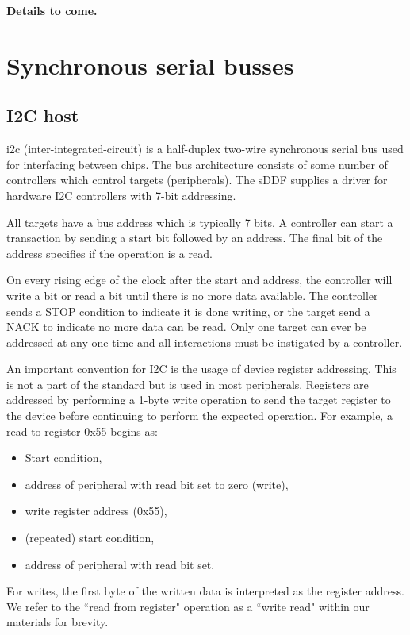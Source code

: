 \documentclass[a4paper,12pt]{report}
\newcommand{\ToCome}[1]{\textbf{#1 to come.}}
\begin{document}
\ToCome{Details}


\section{Synchronous serial busses}\label{s:cl-bus}

\subsection{I2C host}\label{s:cl-i2c}

\gls{i2c} (inter-integrated-circuit) is a half-duplex two-wire
synchronous serial bus used for interfacing between chips. The
bus architecture consists of some number of controllers
which control targets (peripherals). The sDDF supplies a
driver for hardware I2C controllers with 7-bit addressing.

All targets have a bus address which is typically 7 bits.
A controller can start a transaction by sending a start bit
followed by an address. The final bit of the address specifies
if the operation is a read.

On every rising edge of the clock after the start and address,
the controller will write a bit or read a bit until there is
no more data available. The controller sends a STOP condition
to indicate it is done writing, or the target send a NACK to
indicate no more data can be read. Only one target can ever
be addressed at any one time and all interactions must be
instigated by a controller.

An important convention for I2C is the usage of device register
addressing. This is not a part of the standard but is used in
most peripherals. Registers are addressed by performing a 1-byte
write operation to send the target register to the device before
continuing to perform the expected operation. For example, a read
to register 0x55 begins as:
\begin{itemize}
  \item Start condition,
  \item address of peripheral with read bit set to zero (write),
  \item write register address (0x55),
  \item (repeated) start condition,
  \item address of peripheral with read bit set.
\end{itemize}

For writes, the first byte of the written data is interpreted as
the register address. We refer to the ``read from register" operation
as a ``write read" within our materials for brevity.
\end{document}

